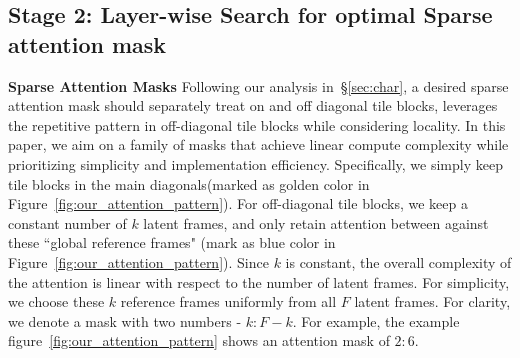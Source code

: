 
\subsection{Stage 2: Layer-wise Search for optimal Sparse attention mask}
\label{sec:method_layerwise}

\textbf{Sparse Attention Masks} Following our analysis in~\S\ref{sec:char}, a desired sparse attention mask should separately treat on and off diagonal tile blocks, leverages the repetitive pattern in off-diagonal tile blocks while considering locality. In this paper, we aim on a family of masks that achieve linear compute complexity while prioritizing simplicity and implementation efficiency. Specifically, we simply keep tile blocks in the main diagonals(marked as golden color in Figure~\ref{fig:our_attention_pattern}). For off-diagonal tile blocks, we keep a constant number of $k$ latent frames, and only retain attention between against these ``global reference frames" (mark as blue color in Figure~\ref{fig:our_attention_pattern}).
Since $k$ is constant, the overall complexity of the attention is linear with respect to the number of latent frames. For simplicity, we choose these $k$ reference frames uniformly from all $F$ latent frames. For clarity, we denote a mask with two numbers - $k: F-k$. For example, the example figure~\ref{fig:our_attention_pattern} shows an attention mask of $2:6$.

